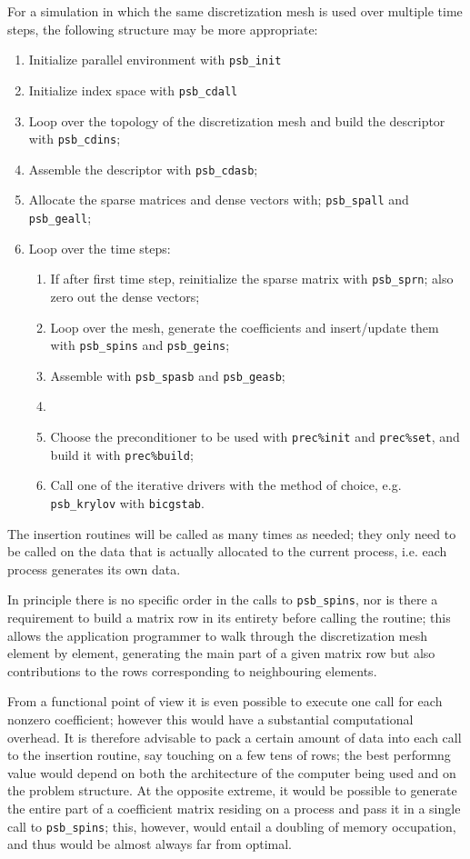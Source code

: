 For a simulation in which the same discretization mesh is used over
multiple time steps, the following structure may be more appropriate:
\begin{enumerate}
\item Initialize parallel environment with \verb|psb_init|
\item Initialize index space with \verb|psb_cdall|
\item Loop over the topology of the discretization mesh and build the
  descriptor with \verb|psb_cdins|;
\item Assemble the descriptor with \verb|psb_cdasb|;
\item Allocate the sparse matrices and dense vectors with;
  \verb|psb_spall| and \verb|psb_geall|;
\item Loop over the time steps: 
\begin{enumerate}
\item If after first time step, 
  reinitialize the sparse matrix with \verb|psb_sprn|; also zero out
  the dense vectors;
\item Loop over the mesh, generate the coefficients and insert/update
  them with \verb|psb_spins| and \verb|psb_geins|;
\item Assemble with \verb|psb_spasb| and \verb|psb_geasb|;
\item \item Choose the preconditioner to be used with \verb|prec%init| and
  \verb|prec%set|,  and
  build it with \verb|prec%build|;
\item Call one of the iterative drivers with the method of
  choice, e.g. \verb|psb_krylov| with \verb|bicgstab|.
 \end{enumerate}
\end{enumerate}
The insertion routines will be called as many times as needed; 
they only need to  be called on the data that is actually
allocated to the current process, i.e. each process generates its own
data. 

In principle there is no specific order in the calls to
\verb|psb_spins|, nor is there a requirement to build a matrix row in
its entirety before calling the routine; this allows the application
programmer to walk through the discretization mesh element by element,
generating the main part of a given matrix row but also contributions
to the rows corresponding to neighbouring elements. 

From a functional point of view it is even possible to execute one
call for each nonzero coefficient; however this would have a
substantial computational overhead. It is therefore advisable to pack
a certain amount of data into each call to the insertion routine, say
touching on a few tens of rows; the best performng value would depend
on both the architecture of the computer being used and on the problem
structure. 
At the opposite extreme, it would be possible to generate the entire
part of a coefficient matrix residing on a process and pass it in a
single call to \verb|psb_spins|; this, however, would entail a
doubling of memory occupation, and thus would be almost always far
from optimal. 

